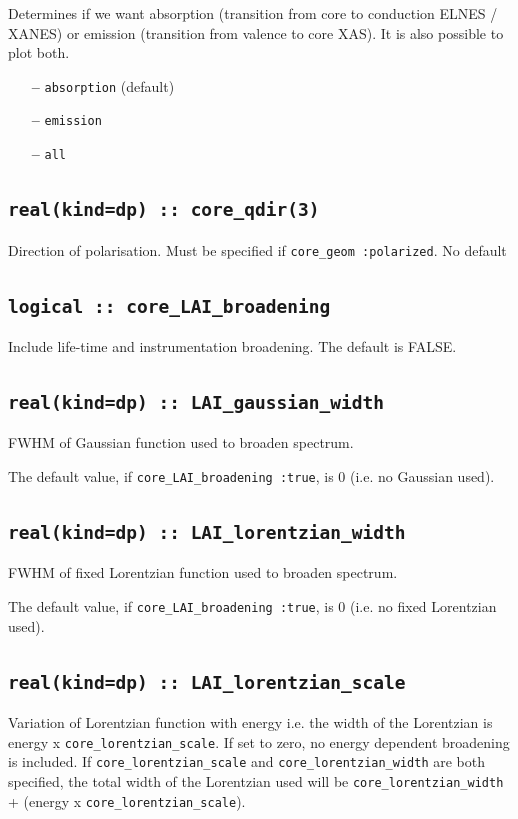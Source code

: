 \documentclass[a4paper,11pt,twoside]{book}
\begin{document}
{Determines if we want absorption (transition from core to conduction
ELNES / XANES)
or emission (transition from valence to core XAS). It is also possible
to plot both.
\begin{itemize}
\item[{\bf --}]  \verb#absorption# (default)
\item[{\bf --}]  \verb#emission#
\item[{\bf --}]  \verb#all#
\end{itemize}


\subsection[core\_qdir]{\tt real(kind=dp) :: core\_qdir(3)}
Direction of polarisation. Must be specified if \verb#core_geom :polarized#.
No default

\subsection[core\_LAI\_broadening]{\tt logical :: core\_LAI\_broadening}
Include life-time and instrumentation broadening.  
The default is FALSE.

\subsection[core\_gaussian\_width]{\tt real(kind=dp) :: LAI\_gaussian\_width}
FWHM of Gaussian function used to broaden spectrum.  

The default value, if \verb#core_LAI_broadening :true#, is 0 (i.e. no Gaussian used).

\subsection[core\_lorentzian\_width]{\tt real(kind=dp) :: LAI\_lorentzian\_width}
FWHM of fixed Lorentzian function used to broaden spectrum.  

The default value, if \verb#core_LAI_broadening :true#, is 0 (i.e. no fixed Lorentzian used).

\subsection[core\_lorentzian\_scale]{\tt real(kind=dp) :: LAI\_lorentzian\_scale}
Variation of Lorentzian function with energy i.e. the width of the Lorentzian is energy x 
\verb#core_lorentzian_scale#.  If set to zero, no energy dependent broadening is included.  
If \verb#core_lorentzian_scale# and \verb#core_lorentzian_width# are both specified, the 
total width of the Lorentzian used will be \verb#core_lorentzian_width# + (energy x 
\verb#core_lorentzian_scale#).

}
\end{document}
